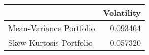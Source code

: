 \begin{tabular}{lr}
\toprule
{} &  Volatility \\
\midrule
Mean-Variance Portfolio &    0.093464 \\
Skew-Kurtosis Portfolio &    0.057320 \\
\bottomrule
\end{tabular}
